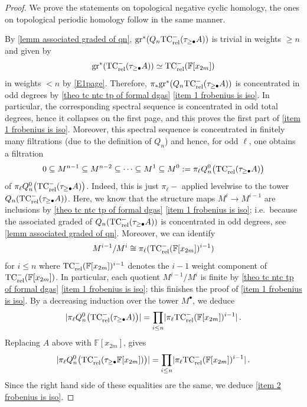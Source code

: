 \documentclass[english,10pt]{amsart}
\newcommand{\rel}{\textup{rel}}
\newcommand{\field}{\mathbb{F}}
\theoremstyle{definition}
\numberwithin{equation}{section}
\newcommand{\rntc}{\mathrm{TC}_{\rel}^{-}}
\newcommand{\wtw}{\tau_{\geq \bullet}}
\newcommand{\pis}{\pi_*}
\newcommand{\gr}{\textup{gr}^*}
\begin{document}
\begin{proof}
We prove the statements on topological negative cyclic homology, the ones on topological periodic homology follow in the same manner. 

By \autoref{lemm associated graded of qn}, $\gr(Q_n \rntc(\tau_{\geq \bullet}A))$ is trivial in weights $\geq n$ and given by
\[
\gr(\rntc(\tau_{\geq \bullet}A))\simeq \rntc(\field[x_{2m}])
\]
in weights $< n$ by \autoref{E1page}. Therefore, 
$\pis \gr(Q_n \rntc(\tau_{\geq \bullet}A))$ 
is concentrated in odd degrees by \autoref{theo tc ntc tp of formal dgas} \eqref{item 1 frobenius is iso}. 
In particular, the corresponding spectral sequence is concentrated in odd total degrees, hence it collapses on the first page, and  this proves the first part of \eqref{item 1 frobenius is iso}. 
Moreover, this spectral sequence is concentrated in finitely many filtrations (due to the definition of $Q_n$) and hence, for odd $\ell$,  one obtains a filtration
\begin{equation}\label{eq filtration on homotopy of qn ntc}
0 \subseteq M^{n-1} \subseteq M^{n-2} \subseteq \cdots \subseteq M^1 \subseteq M^0:= \pi_\ell Q_n^0\big(\rntc(\tau_{\geq \bullet} A)\big)
\end{equation}
of $\pi_\ell Q_n^0\big(\rntc(\tau_{\geq \bullet} A)\big)$. Indeed, this is just $\pi_\ell-$ applied levelwise to the tower $Q_n(\rntc(\wtw A))$. Here, we know that the structure maps $M^{i} \to M^{i-1}$ are inclusions by \autoref{theo tc ntc tp of formal dgas} \eqref{item 1 frobenius is iso}; i.e.\ because the associated graded of $Q_n(\rntc(\wtw A))$ is concentrated in odd degrees, see \autoref{lemm associated graded of qn}. Moreover, we can identify 
\begin{equation}\label{eq quotient of the filtration on homotopy of qn}
M^{i-1}/M^{i}\cong \pi_{\ell} (\rntc(\field[x_{2m}])^{i-1})
\end{equation}
for $i\leq n$ where $\rntc(\field[x_{2m}])^{i-1}$ denotes the $i-1$ weight component of $\rntc(\field[x_{2m}])$. In particular, each quotient $M^{i-1}/M^{i}$ is finite by \autoref{theo tc ntc tp of formal dgas} \eqref{item 1 frobenius is iso}; this finishes the proof of \eqref{item 1 frobenius is iso}. By a decreasing induction over the tower $M^\bullet$, we deduce
\[\lvert \pi_\ell Q_n^0\big(\rntc(\tau_{\geq \bullet} A)\big)\rvert  = \prod_{i \leq n} \lvert \pi_\ell \rntc(\field[x_{2m}])^{i-1}\rvert\,.\]
Replacing $A$ above with $\field[x_{2m}]$, gives
\[\lvert \pi_\ell Q_n^0\big(\rntc(\tau_{\geq \bullet} \field[x_{2m}])\big)\rvert  = \prod_{i \leq n} \lvert \pi_\ell \rntc(\field[x_{2m}])^{i-1}\rvert\,.\]
Since the right hand side of these equalities are the same, we deduce \eqref{item 2 frobenius is iso}.
\end{proof}
\end{document}
